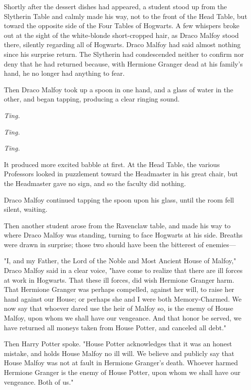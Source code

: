 Shortly after the dessert dishes had appeared, a student stood up from the 
Slytherin Table and calmly made his way, not to the front of the Head Table, 
but toward the opposite side of the Four Tables of Hogwarts. A few whispers 
broke out at the sight of the white-blonde short-cropped hair, as Draco Malfoy 
stood there, silently regarding all of Hogwarts. Draco Malfoy had said almost 
nothing since his surprise return. The Slytherin had condescended neither to 
confirm nor deny that he had returned because, with Hermione Granger dead at 
his family's hand, he no longer had anything to fear.

Then Draco Malfoy took up a spoon in one hand, and a glass of water in the 
other, and began tapping, producing a clear ringing sound.

\emph{Ting.}

\emph{Ting.}

\emph{Ting.}

It produced more excited babble at first. At the Head Table, the various 
Professors looked in puzzlement toward the Headmaster in his great chair, but 
the Headmaster gave no sign, and so the faculty did nothing.

Draco Malfoy continued tapping the spoon upon his glass, until the room fell 
silent, waiting.

Then another student arose from the Ravenclaw table, and made his way to where 
Draco Malfoy was standing, turning to face Hogwarts at his side. Breaths were 
drawn in surprise; those two should have been the bitterest of enemies---

"I, and my Father, the Lord of the Noble and Most Ancient House of Malfoy," 
Draco Malfoy said in a clear voice, "have come to realize that there are ill 
forces at work in Hogwarts. That these ill forces, did wish Hermione Granger 
harm. That Hermione Granger was perhaps compelled, against her will, to raise 
her hand against our House; or perhaps she and I were both Memory-Charmed. We 
now say that whoever dared use the heir of Malfoy so, is the enemy of House 
Malfoy, upon whom we shall have our vengeance. And that honor be served, we 
have returned all moneys taken from House Potter, and canceled all debt."

Then Harry Potter spoke. "House Potter acknowledges that it was an honest 
mistake, and holds House Malfoy no ill will. We believe and publicly say that 
House Malfoy was not at fault in Hermione Granger's death. Whoever harmed 
Hermione Granger is the enemy of House Potter, upon whom we shall have our 
vengeance. Both of us."

